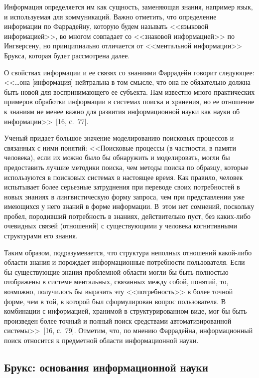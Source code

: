 \begin{multicols}{2}
      Информация определяется им как сущность, заменяющая знания, например язык, и
используемая для коммуникаций. Важно отметить, что определение информации по
Фаррадейну, которую будем называть <<языковой информацией>>, во многом совпадает со
<<знаковой информацией>> по Ингверсену, но принципиально отличается от <<ментальной
информации>> Брукса, которая будет рассмотрена далее.

      О свойствах информации и ее связях со знаниями Фаррадейн говорит следующее:
<<\ldots она [информация] нейтральна в том смысле, что она не обязательно должна быть новой
для вос\-при\-ни\-ма\-юще\-го ее субъекта. Нам известно много практических примеров обработки
информации в системах поиска и хранения, но ее отношение к знаниям не менее важно для
развития информационной науки как науки об информации>>~[16, с.~77].

      Ученый придает большое значение моделированию поисковых процессов и связанных с
ними понятий: <<Поисковые процессы (в частности, в памяти человека), если их можно было
бы обнаружить и моделировать, могли бы предоставить лучшие методики поиска, чем методы
поиска по образцу, которые используются в поисковых системах в настоящее время. Как
правило, человек испытывает более серьезные затруднения при переводе своих потребностей в
новых знаниях в лингвистическую форму запроса, чем при представлении уже имеющихся у
него знаний в форме информации. В~этом нет сомнений, поскольку пробел, породивший
потребность в знаниях, действительно пуст, без каких-либо очевидных связей (отношений) с
существующими у человека когнитивными структурами его знания.

      Таким образом, подразумевается, что структура неполных отношений какой-либо
области знания и порождает информационные потребности пользователя. Если бы
существующие знания проблемной области могли бы быть полностью отображены в системе
ментальных, связанных между собой, понятий, то, возможно, получилось бы выразить эту
<<потребность>> в более точной форме, чем в той, в которой был сформулирован вопрос
пользователя. В комбинации с информацией, хранимой в структурированном виде, мог бы быть
произведен более точный и полный поиск средствами автоматизированной
системы>>~[16, с.~79]. Отметим, что, по мнению Фаррадейна, информационный
поиск относится к предметной области информационной науки.

\subsection{Брукс: основания информационной науки} %


\end{multicols}
